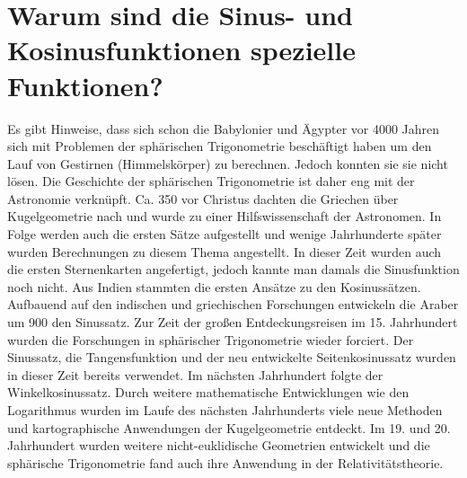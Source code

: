 


\section{Warum sind die Sinus- und Kosinusfunktionen spezielle Funktionen?}
Es gibt Hinweise, dass sich schon die Babylonier und Ägypter vor 4000 Jahren sich mit Problemen der sphärischen Trigonometrie beschäftigt haben um den Lauf von Gestirnen (Himmelskörper) zu berechnen. 
Jedoch konnten sie sie nicht lösen. 
Die Geschichte der sphärischen Trigonometrie ist daher eng mit der Astronomie verknüpft. Ca. 350 vor Christus dachten die Griechen über Kugelgeometrie nach und wurde zu einer Hilfswissenschaft der Astronomen. 
In Folge werden auch die ersten Sätze aufgestellt und wenige Jahrhunderte später wurden Berechnungen zu diesem Thema angestellt. 
In dieser Zeit wurden auch die ersten Sternenkarten angefertigt, jedoch kannte man damals die Sinusfunktion noch nicht. 
Aus Indien stammten die ersten Ansätze zu den Kosinussätzen.
Aufbauend auf den indischen und griechischen Forschungen entwickeln die Araber um 900 den Sinussatz. 
Zur Zeit der großen Entdeckungsreisen im 15. Jahrhundert wurden die Forschungen in sphärischer Trigonometrie wieder forciert. 
Der Sinussatz, die Tangensfunktion und der neu entwickelte Seitenkosinussatz wurden in dieser Zeit bereits verwendet. 
Im nächsten Jahrhundert folgte der Winkelkosinussatz. 
Durch weitere mathematische Entwicklungen wie den Logarithmus wurden im Laufe des nächsten Jahrhunderts viele neue Methoden und kartographische Anwendungen der Kugelgeometrie entdeckt. 
Im 19. und 20. Jahrhundert wurden weitere nicht-euklidische Geometrien entwickelt und die sphärische Trigonometrie fand auch ihre Anwendung in der Relativitätstheorie.